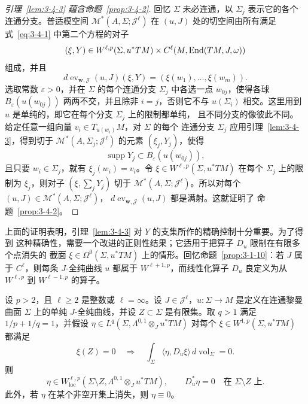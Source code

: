 \begin{proof}[引理~\ref{lem:3-4-3} 蕴含命题~\ref{prop:3-4-2}]
回忆 $\Sigma$ 未必连通，以 $\Sigma_j$ 表示它的各个连通分支。普适模空间
$\mathcal M^*(A,\Sigma;\mathcal J^\ell)$ 在 $(u,J)$ 处的切空间由所有满足
式~\eqref{eq:3-4-1} 中第二个方程的对子
\[
  (\xi,Y)\in W^{\ell,p}(\Sigma,u^*TM)
  \times C^\ell(M,\operatorname{End}(TM,J,\omega))
\]
组成，并且
\[
  d\operatorname{ev}_{\mathbf w,\mathcal J}(u,J)(\xi,Y)
  =(\xi(w_1),\ldots,\xi(w_m)).
\]
选取常数 $\varepsilon>0$，并在 $\Sigma$ 的每个连通分支 $\Sigma_j$ 中各选一点
$w_{0j}$，使得各球 $B_\varepsilon(u(w_{0j}))$ 两两不交，并且除非 $i=j$，否则它不与
$u(\Sigma_i)$ 相交。这里用到 $u$ 是单纯的，即它在每个分支 $\Sigma_j$ 上的限制都单纯，
且不同分支的像彼此不同。给定任意一组向量 $v_i\in T_{u(w_i)}M$，对 $\Sigma$ 的每个
连通分支 $\Sigma_j$ 应用引理~\ref{lem:3-4-3}，得到切于
$\mathcal M^*(A,\Sigma_j;\mathcal J^\ell)$ 的元素 $(\xi_j,Y_j)$，使得
\[
  \operatorname{supp}Y_j\subset B_\varepsilon(u(w_{0j})),
\]
且只要 $w_i\in\Sigma_j$，就有 $\xi_j(w_i)=v_i$。令
$\xi\in W^{\ell,p}(\Sigma,u^*TM)$ 在每个 $\Sigma_j$ 上的限制为 $\xi_j$，则对子
$(\xi,\sum_jY_j)$ 切于 $\mathcal M^*(A,\Sigma;\mathcal J^\ell)$。所以对每个
$(u,J)\in\mathcal M^*(A,\Sigma;\mathcal J^\ell)$，
$d\operatorname{ev}_{\mathbf w,\mathcal J}(u,J)$ 都是满射。这就证明了
命题~\ref{prop:3-4-2}。
\end{proof}

上面的证明表明，引理~\ref{lem:3-4-3} 对 $Y$ 的支集所作的精确控制十分重要。为了得到
这种精确性，需要一个改进的正则性结果；它适用于把算子 $D_u$ 限制在有限多个点消失的
截面 $\xi\in\Omega^0(\Sigma,u^*TM)$ 上的情形。回忆命题~\ref{prop:3-1-10}：若
$J$ 属于 $C^\ell$，则每条 $J$-全纯曲线 $u$ 都属于 $W^{\ell+1,p}$，而线性化算子
$D_u$ 良定义为从 $W^{\ell,p}$ 到 $W^{\ell-1,p}$ 的算子。

\begin{lemma}\label{lem:3-4-4}
设 $p>2$，且 $\ell\ge2$ 是整数或 $\ell=\infty$。设
$J\in\mathcal J^\ell$，$u:\Sigma\to M$ 是定义在连通黎曼曲面 $\Sigma$ 上的单纯
$J$-全纯曲线，并设 $Z\subset\Sigma$ 是有限集。取 $q>1$ 满足
$1/p+1/q=1$，并假设
$\eta\in L^q(\Sigma,\Lambda^{0,1}\otimes_Ju^*TM)$ 对每个
$\xi\in W^{1,p}(\Sigma,u^*TM)$ 都满足
\begin{equation}\label{eq:3-4-2}
  \xi(Z)=0
  \quad\Longrightarrow\quad
  \int_\Sigma\langle\eta,D_u\xi\rangle\,
  d\operatorname{vol}_\Sigma=0.
\end{equation}
则
\[
  \eta\in W_{\mathrm{loc}}^{\ell,p}
  (\Sigma\setminus Z,\Lambda^{0,1}\otimes_Ju^*TM),
  \qquad
  D_u^*\eta=0\quad\text{在 }\Sigma\setminus Z\text{ 上}.
\]
此外，若 $\eta$ 在某个非空开集上消失，则 $\eta\equiv0$。
\end{lemma}

